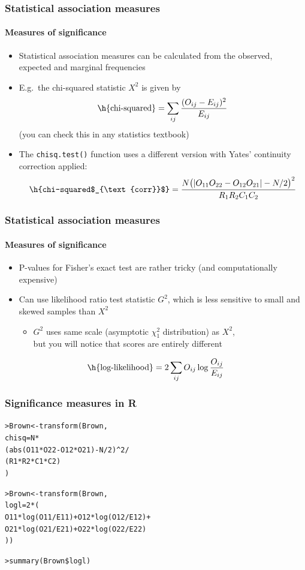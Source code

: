 \documentclass[handout,notes=show,t]{beamer} %
\begin{document}
\begin{frame}
  \frametitle{Statistical association measures}
  \framesubtitle{Measures of significance}

  \begin{itemize}
  \item Statistical association measures can be calculated from the observed,
    expected and marginal frequencies%
    \pause
  \item E.g.\ the chi-squared statistic $X^2$ is given by
    \[
    \text{\h{chi-squared}} =
    \sum_{ij} \frac{(O_{ij} - E_{ij})^2}{E_{ij}}
    \]
    (you can check this in any statistics textbook)%
    \pause
  \item The \texttt{chisq.test()} function uses a different version with
    Yates' continuity correction applied:
    \[
    \text{\h{chi-squared$_{\text{corr}}$}} =
    \frac{
      N \bigl( | O_{11}O_{22} - O_{12} O_{21} | - N/2 \bigr)^2
    }{
      R_1 R_2 C_1 C_2
    }
    \]
  \end{itemize}
\end{frame}

\begin{frame}
  \frametitle{Statistical association measures}
  \framesubtitle{Measures of significance}

  \begin{itemize}
  \item P-values for Fisher's exact test are rather tricky (and
    computationally expensive)
  \item Can use likelihood ratio test statistic $G^2$, which is less sensitive
    to small and skewed samples than $X^2$\\
    \citep{Dunning:93,Dunning:98,Evert:04phd}
    \begin{itemize}
    \item $G^2$ uses same scale (asymptotic $\chi^2_1$ distribution) as $X^2$,\\
      but you will notice that scores are entirely different
    \end{itemize}
  \end{itemize}
  \vspace{5mm}
  \[
  \text{\h{log-likelihood}} =
  2 \sum_{ij} O_{ij} \log {\frac {O_{ij}}{E_{ij}}}
  \]
\end{frame}

\begin{frame}[fragile]
  \frametitle{Significance measures in R}

  \begin{alltt}
> Brown <- transform(Brown,
    chisq = N *
    (abs(O11*O22 - O12*O21) - N/2)^2 /
    (R1 * R2 * C1 * C2)
  )

\pause
> Brown <- transform(Brown,
  logl = 2 * (
    O11*log(O11/E11) + O12*log(O12/E12) +
    O21*log(O21/E21) + O22*log(O22/E22)
  ))

> summary(Brown\$logl)  
  \end{alltt}
\end{frame}
\end{document}

